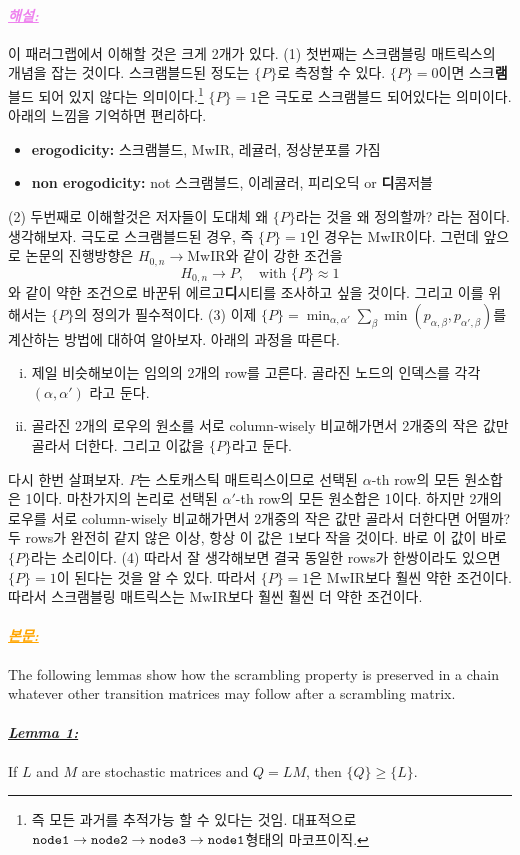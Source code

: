 \documentclass[12pt,oneside,english,a4paper]{article}
\newcommand{\para}[1]{\paragraph{\LARGE\it\underline{\textbf{#1:}}}\LARGE}
\newcommand{\paraviolet}[1]{\paragraph{\LARGE\textcolor{violet}{\it\underline{\textbf{#1:}}}}\LARGE}
\newcommand{\paraorange}[1]{\paragraph{\LARGE\textcolor{orange}{\it\underline{\textbf{#1:}}}}\LARGE}
\begin{document}
\paraviolet{해설} 이 패러그랩에서 이해할 것은 크게 2개가 있다. (1) 첫번째는 스크램블링 매트릭스의 개념을 잡는 것이다. 스크램블드된 정도는 $\{P\}$로 측정할 수 있다. $\{P\}=0$이면 스크{\bf 램}블드 되어 있지 않다는 의미이다.\footnote{즉 모든 과거를 추적가능 할 수 있다는 것임. 대표적으로 $\tt node1 \to node2 \to node3 \to node1$형태의 마코프이직.} $\{P\}=1$은 극도로 스크램블드 되어있다는 의미이다. 아래의 느낌을 기억하면 편리하다. 
\begin{itemize}
	\item {\bf erogodicity:} 스크램블드, MwIR, 레귤러, 정상분포를 가짐
	\item {\bf non erogodicity:} not 스크램블드, 이레귤러, 피리오딕 or {\bf 디}콤{}저블
\end{itemize}
(2) 두번째로 이해할것은 저자들이 도대체 왜 $\{P\}$라는 것을 왜 정의할까? 라는 점이다. 생각해보자. 극도로 스크램블드된 경우, 즉 $\{P\}=1$인 경우는 MwIR이다. 그런데 앞으로 논문의 진행방향은 $H_{0,n} \to \mbox{MwIR}$와 같이 강한 조건을 
\[
H_{0,n} \to P, \quad \mbox{with } \{P\}\approx 1
\]
와 같이 약한 조건으로 바꾼뒤 에르고{\bf 디}시티를 조사하고 싶을 것이다. 그리고 이를 위해서는 $\{P\}$의 정의가 필수적이다. (3) 이제 $\{P\}=\min_{\alpha,\alpha'}\sum_{\beta}\min(p_{\alpha,\beta},p_{\alpha',\beta})$를 계산하는 방법에 대하여 알아보자. 아래의 과정을 따른다. 
\begin{enumerate}[(i)]
\item 제일 비슷해보이는 임의의 2개의 row를 고른다. 골라진 노드의 인덱스를 각각 $(\alpha,\alpha')$ 라고 둔다. 
\item 골라진 2개의 로우의 원소를 서로 column-wisely 비교해가면서 2개중의 작은 값만 골라서 더한다. 그리고 이값을 $\{P\}$라고 둔다. 
\end{enumerate}
다시 한번 살펴보자. $P$는 스토캐스틱 매트릭스이므로 선택된 $\alpha$-th row의 모든 원소합은 1이다. 마찬가지의 논리로 선택된 $\alpha'$-th row의 모든 원소합은 1이다. 하지만 2개의 로우를 서로 column-wisely 비교해가면서 2개중의 작은 값만 골라서 더한다면 어떨까? 두 rows가 완전히 같지 않은 이상, 항상 이 값은 1보다 작을 것이다. 바로 이 값이 바로 $\{P\}$라는 소리이다. 
(4) 따라서 잘 생각해보면 결국 동일한 rows가 한쌍이라도 있으면 $\{P\}=1$이 된다는 것을 알 수 있다. 따라서 $\{P\}=1$은 MwIR보다 훨씬 약한 조건이다. 따라서 스크램블링 매트릭스는 MwIR보다 훨씬 훨씬 더 약한 조건이다. 

\paraorange{본문} The following lemmas show how the scrambling property is preserved in a chain whatever other transition matrices may follow after a scrambling matrix.
\para{Lemma 1} If $L$ and $M$ are stochastic matrices and $Q=LM$, then $\{Q\} \geq \{L\}.$
\end{document}
